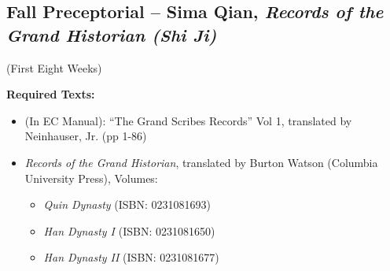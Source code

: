 \documentclass{article}
\newcounter{cntSemester} %
\begin{document}
\clearpage


\begin{center}
	\section{Fall Preceptorial – Sima Qian, \textit{Records of the Grand Historian (Shi Ji)}}
	 (First Eight Weeks)
\end{center}

\textbf{Required Texts:}
\begin{itemize}
	\item (In EC Manual): “The Grand Scribes Records” Vol 1, translated by Neinhauser, Jr. (pp 1-86)
	\item \textit{Records of the Grand Historian}, translated by Burton Watson (Columbia University Press), Volumes:
	      \begin{itemize}
		      \item \textit{Quin Dynasty} (ISBN: 0231081693)
		      \item \textit{Han Dynasty I} (ISBN: 0231081650)
		      \item \textit{Han Dynasty II} (ISBN: 0231081677)
	      \end{itemize}
\end{itemize}
\end{document}
